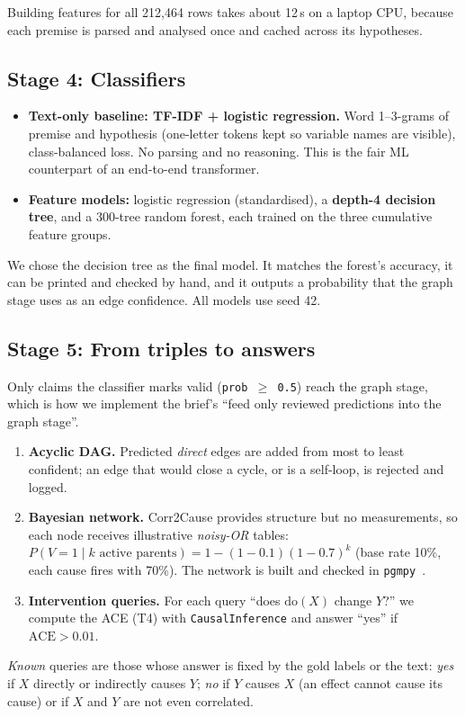 \documentclass[11pt,a4paper]{article}
\newcommand{\chip}[2]{\tcbox[on line,colback=#1,colframe=#1,coltext=white,arc=2pt,boxsep=0pt,
  left=3pt,right=3pt,top=1.5pt,bottom=1.5pt,fontupper=\sffamily\bfseries\scriptsize]{#2}}
\newcommand{\GL}{\chip{causal}{GRAPH}}
\newcommand{\code}[1]{\texttt{\small\color{neural!80!black}#1}}
\newcommand{\doop}{\mathrm{do}}
\begin{document}
Building features for all 212{,}464 rows takes about 12\,s on a laptop CPU, because each premise is parsed and
analysed once and cached across its hypotheses.

\subsection{Stage 4: Classifiers}
\begin{itemize}
  \item \textbf{Text-only baseline: TF-IDF + logistic regression.} Word 1--3-grams of premise and hypothesis
        (one-letter tokens kept so variable names are visible), class-balanced loss. No parsing and no reasoning.
        This is the fair ML counterpart of an end-to-end transformer.
  \item \textbf{Feature models:} logistic regression (standardised), a \textbf{depth-4 decision tree}, and a
        300-tree random forest, each trained on the three cumulative feature groups.
\end{itemize}
We chose the decision tree as the final model. It matches the forest's accuracy, it can be printed and checked by
hand, and it outputs a probability that the graph stage uses as an edge confidence. All models use seed 42.

\subsection{Stage 5: From triples to answers \texorpdfstring{\quad\GL}{}}
Only claims the classifier marks valid (\code{prob\,$\ge$\,0.5}) reach the graph stage, which is how we implement
the brief's ``feed only reviewed predictions into the graph stage''.
\begin{enumerate}[label=\textcolor{causal}{\textbf{\arabic*.}}]
  \item \textbf{Acyclic DAG.} Predicted \emph{direct} edges are added from most to least confident; an edge that
        would close a cycle, or is a self-loop, is rejected and logged.
  \item \textbf{Bayesian network.} Corr2Cause provides structure but no measurements, so each node receives
        illustrative \emph{noisy-OR} tables: $P(V{=}1\mid k \text{ active parents}) = 1-(1-0.1)(1-0.7)^{k}$
        (base rate 10\%, each cause fires with 70\%). The network is built and checked in \texttt{pgmpy}~\cite{ankan2015}.
  \item \textbf{Intervention queries.} For each query ``does $\doop(X)$ change $Y$?'' we compute the ACE (T4) with
        \texttt{CausalInference} and answer ``yes'' if $\mathrm{ACE}>0.01$.
\end{enumerate}
\emph{Known} queries are those whose answer is fixed by the gold labels or the text: \emph{yes} if $X$ directly or
indirectly causes $Y$; \emph{no} if $Y$ causes $X$ (an effect cannot cause its cause) or if $X$ and $Y$ are not even correlated.
\end{document}
